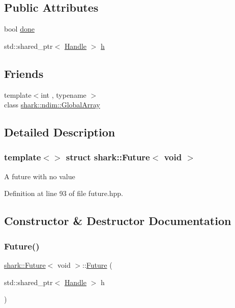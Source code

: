 \subsection*{Public Attributes}
\begin{DoxyCompactItemize}
\item 
bool \hyperlink{structshark_1_1_future_3_01void_01_4_a3645dd42e1230f037fcdacea7880bb41}{done}
\item 
std\+::shared\+\_\+ptr$<$ \hyperlink{classshark_1_1_handle}{Handle} $>$ \hyperlink{structshark_1_1_future_3_01void_01_4_a6cd84878a921af7b50e18accd766677e}{h}
\end{DoxyCompactItemize}
\subsection*{Friends}
\begin{DoxyCompactItemize}
\item 
{\footnotesize template$<$int , typename $>$ }\\class \hyperlink{structshark_1_1_future_3_01void_01_4_a8a5e7aad8bd5339747078692740c0a59}{shark\+::ndim\+::\+Global\+Array}
\end{DoxyCompactItemize}


\subsection{Detailed Description}
\subsubsection*{template$<$$>$\newline
struct shark\+::\+Future$<$ void $>$}

A future with no value 

Definition at line 93 of file future.\+hpp.



\subsection{Constructor \& Destructor Documentation}
\hypertarget{structshark_1_1_future_3_01void_01_4_a3c0708ce00cad84931544af6c7f415d1}{}\label{structshark_1_1_future_3_01void_01_4_a3c0708ce00cad84931544af6c7f415d1} 
\subsubsection{\texorpdfstring{Future()}{Future()}\hspace{0.1cm}{\footnotesize\ttfamily [1/4]}}
{\footnotesize\ttfamily \hyperlink{structshark_1_1_future}{shark\+::\+Future}$<$ void $>$\+::\hyperlink{structshark_1_1_future}{Future} (\begin{DoxyParamCaption}\item[{std\+::shared\+\_\+ptr$<$ \hyperlink{classshark_1_1_handle}{Handle} $>$}]{h }\end{DoxyParamCaption})}

